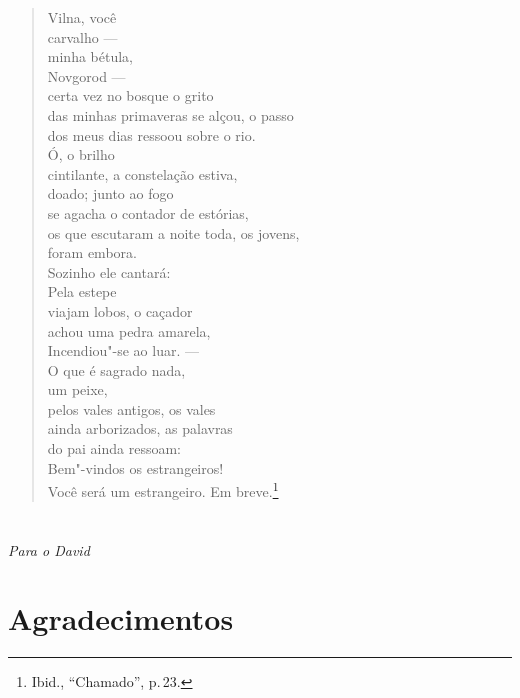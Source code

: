 %
\begin{verse}
Vilna, você\\
carvalho ---\\
minha bétula,\\
Novgorod ---\\
certa vez no bosque o grito\\
das minhas primaveras se alçou, o passo\\
dos meus dias ressoou sobre o rio.\\[10pt]
Ó, o brilho\\
cintilante, a constelação estiva,\\
doado; junto ao fogo\\
se agacha o contador de estórias,\\
os que escutaram a noite toda, os jovens,\\
foram embora.\\[10pt]
Sozinho ele cantará:\\
Pela estepe\\
viajam lobos, o caçador\\
achou uma pedra amarela,\\
Incendiou"-se ao luar. ---\\[10pt]
O que é sagrado nada,\\
um peixe,\\
pelos vales antigos, os vales\\
ainda arborizados, as palavras\\
do pai ainda ressoam:\\
Bem"-vindos os estrangeiros!\\
Você será um estrangeiro. Em breve.\footnote{Ibid., ``Chamado'', p.\,23.}
\end{verse}


\chapter*{}
\thispagestyle{empty}

\vfill
\hfill\textit{Para o David}

\chapter{Agradecimentos}

